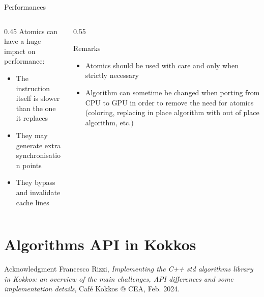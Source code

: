 \documentclass[
    aspectratio=169,
    \createHandout
]{beamer}
\begin{document}
\begin{frame}[fragile]{Performances}
    \begin{columns}
        \begin{column}{0.45\linewidth}
            Atomics can have a huge impact on performance:
            \begin{itemize}
                \item The instruction itself is slower than the one it replaces
                \item They may generate extra synchronisation points
                \item They bypass and invalidate cache lines
            \end{itemize}
        \end{column}
        \begin{column}{0.55\linewidth}
            \begin{block}{Remarks}
                \begin{itemize}
                    \item Atomics should be used with care and only when strictly
                    necessary
                    \item Algorithm can sometime be changed when porting from CPU to GPU
                    in order to remove the need for atomics (coloring, replacing in
                    place algorithm with out of place algorithm, etc.)
                \end{itemize}
            \end{block}
        \end{column}
    \end{columns}
\end{frame}


\section{Algorithms API in Kokkos}

\begin{frame}[fragile]{Acknowledgment}
    Francesco Rizzi, \emph{Implementing the C++ std algorithms library in
    Kokkos: an overview of the main challenges, API differences and
    some implementation details}, Café Kokkos @ CEA, Feb. 2024.

    \vspace{1em}

\end{frame}
\end{document}
